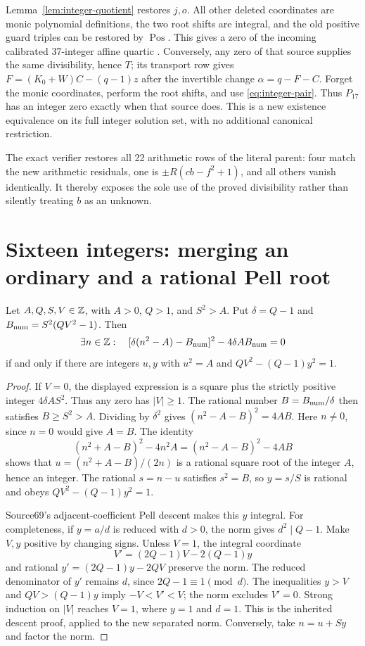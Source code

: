 Lemma~\ref{lem:integer-quotient} restores $j,o$. All other deleted
coordinates are monic polynomial definitions, the two root shifts are
integral, and the old positive guard triples can be restored by
$\operatorname{Pos}$. This gives a zero of the incoming calibrated
37-integer affine quartic \cite{round11}. Conversely, any zero of that
source supplies the same divisibility, hence $T$; its transport row gives
$F=(K_0+W)C-(q-1)z$ after the invertible change
$\alpha=q-F-C$. Forget the monic coordinates, perform the root shifts,
and use \eqref{eq:integer-pair}. Thus $P_{17}$ has an integer zero
exactly when that source does. This is a new existence equivalence on
its full integer solution set, with no additional canonical restriction.

The exact verifier restores all 22 arithmetic rows of the literal parent:
four match the new arithmetic residuals, one is $\pm R(cb-f^2+1)$,
and all others vanish identically. It thereby exposes the sole use of the
proved divisibility rather than silently treating $b$ as an unknown.

\section{Sixteen integers: merging an ordinary and a rational Pell root}
\label{sec:integer16}

\begin{lemma}\label{lem:integer-rational-norm}
Let $A,Q,S,V\in\mathbb Z$, with $A>0$, $Q>1$, and $S^2>A$.
Put $\delta=Q-1$ and $B_{\rm num}=S^2(QV^2-1)$. Then
\[
 \exists n\in\mathbb Z:\quad
 [\delta(n^2-A)-B_{\rm num}]^2-4\delta A B_{\rm num}=0
\]
if and only if there are integers $u,y$ with
$u^2=A$ and $QV^2-(Q-1)y^2=1$.
\end{lemma}
\begin{proof}
If $V=0$, the displayed expression is a square plus the strictly positive
integer $4\delta AS^2$. Thus any zero has $|V|\ge1$. The rational number
$B=B_{\rm num}/\delta$ then satisfies $B\ge S^2>A$.
Dividing by $\delta^2$ gives $(n^2-A-B)^2=4AB$.
Here $n\ne0$, since $n=0$ would give $A=B$. The identity
\[
 (n^2+A-B)^2-4n^2A=(n^2-A-B)^2-4AB
\]
shows that $u=(n^2+A-B)/(2n)$ is a rational square root of the integer
$A$, hence an integer. The rational $s=n-u$ satisfies $s^2=B$, so
$y=s/S$ is rational and obeys $QV^2-(Q-1)y^2=1$.

Source69's adjacent-coefficient Pell descent makes this $y$ integral.
For completeness, if $y=a/d$ is reduced with $d>0$, the norm gives
$d^2\mid Q-1$. Make $V,y$ positive by changing signs. Unless $V=1$,
the integral coordinate
\[
 V'=(2Q-1)V-2(Q-1)y
\]
and rational $y'=(2Q-1)y-2QV$ preserve the norm. The reduced denominator
of $y'$ remains $d$, since $2Q-1\equiv1\pmod d$.
The inequalities $y>V$ and $QV>(Q-1)y$ imply $-V<V'<V$; the norm
excludes $V'=0$. Strong induction on $|V|$ reaches $V=1$, where
$y=1$ and $d=1$. This is the inherited descent proof, applied to the
new separated norm. Conversely, take $n=u+Sy$ and factor the norm.
\end{proof}


